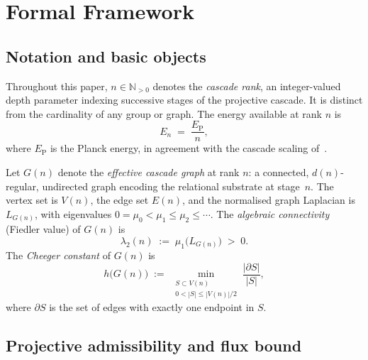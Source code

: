 \section{Formal Framework}
  \label{sec:framework}

  \subsection{Notation and basic objects}
    \label{sec:framework:notation}

    Throughout this paper, $n \in \mathbb{N}_{>0}$ denotes the \emph{cascade rank},
    an integer-valued depth parameter indexing successive stages of the projective cascade.
    It is distinct from the cardinality of any group or graph.
    The energy available at rank $n$ is
    \begin{equation}
      \label{eq:energy-rank}
      E_n \;=\; \frac{E_{\mathrm{P}}}{n},
    \end{equation}
    where $E_{\mathrm{P}}$ is the Planck energy, in agreement with the cascade
    scaling of~\cite{Beau2026a4}.

    Let $G(n)$ denote the \emph{effective cascade graph} at rank $n$: a
    connected, $d(n)$-regular, undirected graph encoding the relational substrate
    at stage~$n$.
    The vertex set is $V(n)$, the edge set $E(n)$, and the normalised graph
    Laplacian is $L_{G(n)}$, with eigenvalues
    $0 = \mu_0 < \mu_1 \leq \mu_2 \leq \cdots$.
    The \emph{algebraic connectivity} (Fiedler value) of $G(n)$ is
    \begin{equation}
      \label{eq:fiedler}
      \lambda_2(n) \;:=\; \mu_1\bigl(L_{G(n)}\bigr) \;>\; 0.
    \end{equation}
    The \emph{Cheeger constant} of $G(n)$ is
    \begin{equation}
      \label{eq:cheeger-def}
      h\bigl(G(n)\bigr)
      \;:=\;
      \min_{\substack{S \subset V(n) \\ 0 < |S| \leq |V(n)|/2}}
      \frac{|\partial S|}{|S|},
    \end{equation}
    where $\partial S$ is the set of edges with exactly one endpoint in $S$.

  \subsection{Projective admissibility and flux bound}
    \label{sec:framework:admissibility}

